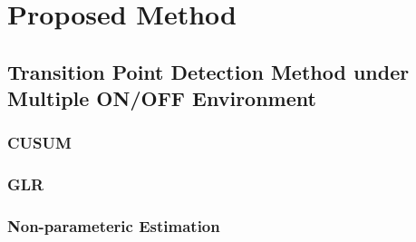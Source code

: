 \chapter[Active Period Detection Method of Primary Signal for Radio Environment Database]{Proposed Method}

\section{Transition Point Detection Method under Multiple ON/OFF Environment }
    \subsection{CUSUM}

    \subsection{GLR}

    \subsection{Non-parameteric Estimation}



